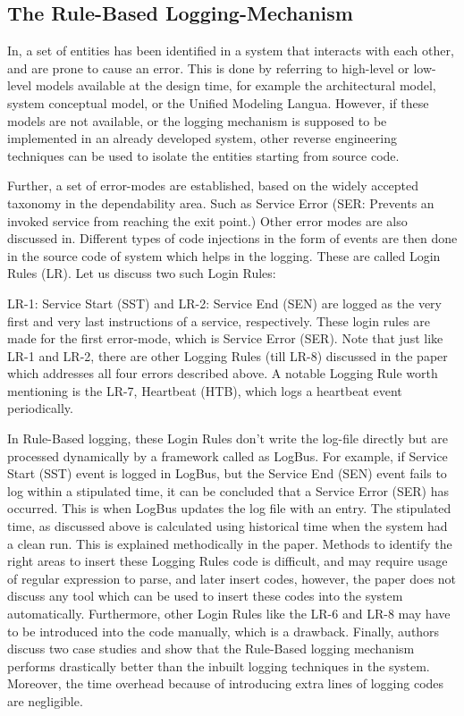 \subsection{The Rule-Based Logging-Mechanism}

In\cite{Cinque2013}, a set of entities has been identified in a system that interacts with each other, and are prone to cause an error. This is done by referring to high-level or low-level models available at the design time, for example the architectural model, system conceptual model, or the Unified Modeling Langua. However, if these models are not available, or the logging mechanism is supposed to be implemented in an already developed system, other reverse engineering techniques can be used to isolate the entities starting from source code.

Further, a set of error-modes are established, based on the widely accepted taxonomy in the dependability area\cite{Avizienis2004}. Such as Service Error (SER: Prevents an invoked service from reaching the exit point.) Other error modes are also discussed in\cite{Cinque2013}. Different types of code injections in the form of events are then done in the source code of system which helps in the logging. These are called Login Rules (LR). Let us discuss two such Login Rules:

LR-1: Service Start (SST) and LR-2: Service End (SEN) are logged as the very first and very last instructions of a service, respectively. These login rules are made for the first error-mode, which is Service Error (SER). Note that just like LR-1 and LR-2, there are other Logging Rules (till LR-8) discussed in the paper which addresses all four errors described above. A notable Logging Rule worth mentioning is the LR-7, Heartbeat (HTB), which logs a heartbeat event periodically. 

In Rule-Based logging, these Login Rules don’t write the log-file directly but are processed dynamically by a framework called as LogBus. For example, if Service Start (SST) event is logged in LogBus, but the Service End (SEN) event fails to log within a stipulated time, it can be concluded that a Service Error (SER) has occurred. This is when LogBus updates the log file with an entry. The stipulated time, as discussed above is calculated using historical time when the system had a clean run. This is explained methodically in the paper. Methods to identify the right areas to insert these Logging Rules code is difficult, and may require usage of regular expression to parse, and later insert codes, however, the paper does not discuss any tool which can be used to insert these codes into the system automatically. Furthermore, other Login Rules like the LR-6 and LR-8 may have to be introduced into the code manually, which is a drawback. Finally, authors discuss two case studies and show that the Rule-Based logging mechanism performs drastically better than the inbuilt logging techniques in the system. Moreover, the time overhead because of introducing extra lines of logging codes are negligible.

